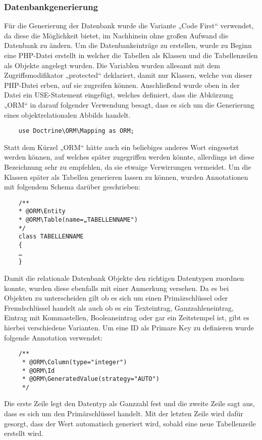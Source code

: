     \subsubsection{Datenbankgenerierung}

	Für die Generierung der Datenbank wurde die Variante „Code First“ verwendet, da diese die Möglichkeit bietet, im Nachhinein ohne großen Aufwand die Datenbank zu ändern.
	Um die Datenbankeinträge zu erstellen, wurde zu Beginn eine PHP-Datei erstellt in welcher die Tabellen als Klassen und die Tabellenzeilen als Objekte angelegt wurden. Die Variablen wurden allesamt mit dem Zugriffsmodifikator „protected“ deklariert, damit nur Klassen, welche von dieser PHP-Datei erben, auf sie zugreifen können. Anschließend wurde oben in der Datei ein USE-Statement eingefügt, welches definiert, dass die Abkürzung „ORM“ in darauf folgender Verwendung besagt, dass es sich um die Generierung eines objektrelationalen Abbilds handelt.
	\lstset{language = php}
  	\begin{lstlisting}
	use Doctrine\ORM\Mapping as ORM;
  	\end{lstlisting}
	Statt dem Kürzel „ORM“ hätte auch ein beliebiges anderes Wort eingesetzt werden können, auf welches später zugegriffen werden könnte, allerdings ist diese Bezeichnung sehr zu empfehlen, da sie etwaige Verwirrungen vermeidet.
	Um die Klassen später als Tabellen generieren lassen zu können, wurden Annotationen mit folgendem Schema darüber geschrieben:
	\lstset{language = php}
  	\begin{lstlisting}
	/**
 	* @ORM\Entity
 	* @ORM\Table(name=„TABELLENNAME")
	*/
	class TABELLENNAME
	{
	…
	}
    \end{lstlisting}
	Damit die relationale Datenbank Objekte den richtigen Datentypen zuordnen konnte, wurden diese ebenfalls mit einer Anmerkung versehen. Da es bei Objekten zu unterscheiden gilt ob es sich um einen Primärschlüssel oder Fremdschlüssel handelt als auch ob es ein Texteintrag, Ganzzahleneintrag, Eintrag mit Kommastellen, Booleaneintrag oder gar ein Zeitstempel ist, gibt es hierbei verschiedene Varianten.
	Um eine ID als Primare Key zu definieren wurde folgende Annotation verwendet:
	\lstset{language = php}
  	\begin{lstlisting}
  	/**
     * @ORM\Column(type="integer")
     * @ORM\Id
     * @ORM\GeneratedValue(strategy="AUTO")
     */
  	\end{lstlisting}
	Die erste Zeile legt den Datentyp als Ganzzahl fest und die zweite Zeile sagt aus, dass es sich um den Primärschlüssel handelt. Mit der letzten Zeile wird dafür gesorgt, dass der Wert automatisch generiert wird, sobald eine neue Tabellenzeile erstellt wird.

